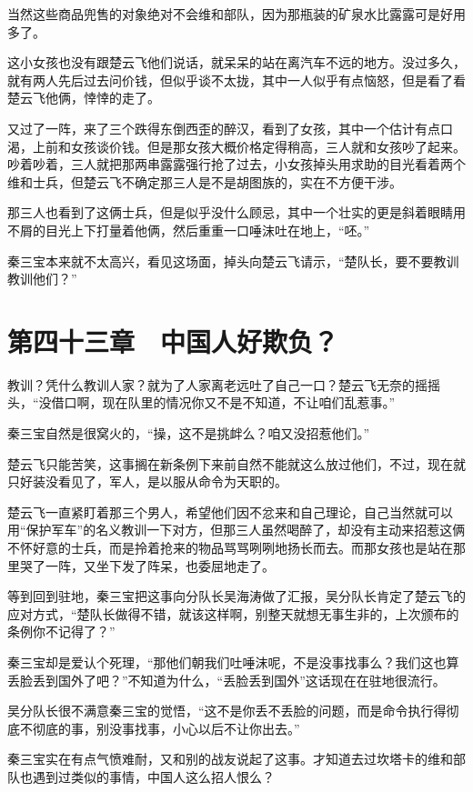 当然这些商品兜售的对象绝对不会维和部队，因为那瓶装的矿泉水比露露可是好用多了。

这小女孩也没有跟楚云飞他们说话，就呆呆的站在离汽车不远的地方。没过多久，就有两人先后过去问价钱，但似乎谈不太拢，其中一人似乎有点恼怒，但是看了看楚云飞他俩，悻悻的走了。

又过了一阵，来了三个跌得东倒西歪的醉汉，看到了女孩，其中一个估计有点口渴，上前和女孩谈价钱。但是那女孩大概价格定得稍高，三人就和女孩吵了起来。吵着吵着，三人就把那两串露露强行抢了过去，小女孩掉头用求助的目光看着两个维和士兵，但楚云飞不确定那三人是不是胡图族的，实在不方便干涉。

那三人也看到了这俩士兵，但是似乎没什么顾忌，其中一个壮实的更是斜着眼睛用不屑的目光上下打量着他俩，然后重重一口唾沫吐在地上，“呸。”

秦三宝本来就不太高兴，看见这场面，掉头向楚云飞请示，“楚队长，要不要教训教训他们？”

\section{第四十三章　中国人好欺负？}

教训？凭什么教训人家？就为了人家离老远吐了自己一口？楚云飞无奈的摇摇头，“没借口啊，现在队里的情况你又不是不知道，不让咱们乱惹事。”

秦三宝自然是很窝火的，“操，这不是挑衅么？咱又没招惹他们。”

楚云飞只能苦笑，这事搁在新条例下来前自然不能就这么放过他们，不过，现在就只好装没看见了，军人，是以服从命令为天职的。

楚云飞一直紧盯着那三个男人，希望他们因不忿来和自己理论，自己当然就可以用“保护军车”的名义教训一下对方，但那三人虽然喝醉了，却没有主动来招惹这俩不怀好意的士兵，而是拎着抢来的物品骂骂咧咧地扬长而去。而那女孩也是站在那里哭了一阵，又坐下发了阵呆，也委屈地走了。

等到回到驻地，秦三宝把这事向分队长吴海涛做了汇报，吴分队长肯定了楚云飞的应对方式，“楚队长做得不错，就该这样啊，别整天就想无事生非的，上次颁布的条例你不记得了？”

秦三宝却是爱认个死理，“那他们朝我们吐唾沫呢，不是没事找事么？我们这也算丢脸丢到国外了吧？”不知道为什么，“丢脸丢到国外”这话现在在驻地很流行。

吴分队长很不满意秦三宝的觉悟，“这不是你丢不丢脸的问题，而是命令执行得彻底不彻底的事，别没事找事，小心以后不让你出去。”

秦三宝实在有点气愤难耐，又和别的战友说起了这事。才知道去过坎塔卡的维和部队也遇到过类似的事情，中国人这么招人恨么？

